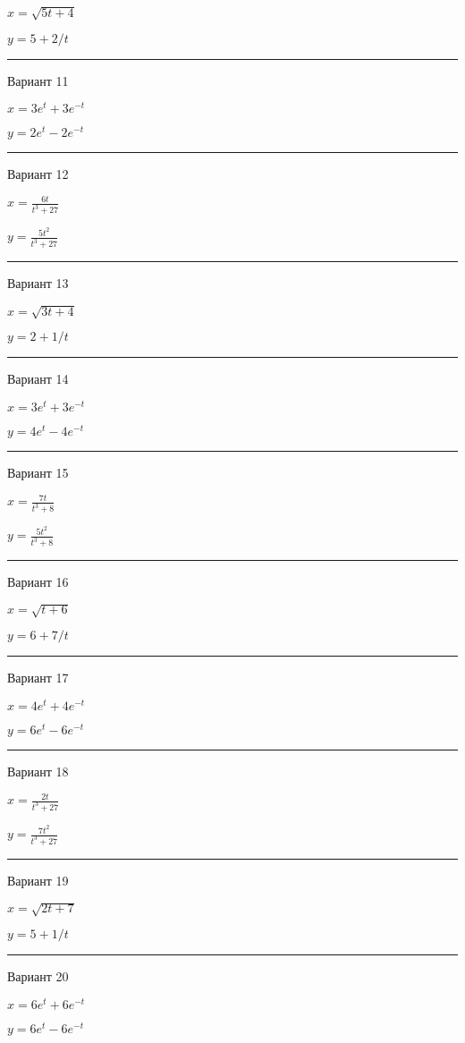 \documentclass[11pt]{report}
\begin{document}
$x = \sqrt{5 t + 4}$

$y = 5 + 2 / t$

\rule{\textwidth}{.2mm}

 Вариант 11

$x = 3 e^{t} + 3 e^{- t}$

$y = 2 e^{t} - 2 e^{- t}$

\rule{\textwidth}{.2mm}

 Вариант 12

$x = \frac{6 t}{t^{3} + 27}$

$y = \frac{5 t^{2}}{t^{3} + 27}$

\rule{\textwidth}{.2mm}

 Вариант 13

$x = \sqrt{3 t + 4}$

$y = 2 + 1 / t$

\rule{\textwidth}{.2mm}

 Вариант 14

$x = 3 e^{t} + 3 e^{- t}$

$y = 4 e^{t} - 4 e^{- t}$

\rule{\textwidth}{.2mm}

 Вариант 15

$x = \frac{7 t}{t^{3} + 8}$

$y = \frac{5 t^{2}}{t^{3} + 8}$

\rule{\textwidth}{.2mm}

 Вариант 16

$x = \sqrt{t + 6}$

$y = 6 + 7 / t$

\rule{\textwidth}{.2mm}

 Вариант 17

$x = 4 e^{t} + 4 e^{- t}$

$y = 6 e^{t} - 6 e^{- t}$

\rule{\textwidth}{.2mm}

 Вариант 18

$x = \frac{2 t}{t^{3} + 27}$

$y = \frac{7 t^{2}}{t^{3} + 27}$

\rule{\textwidth}{.2mm}

 Вариант 19

$x = \sqrt{2 t + 7}$

$y = 5 + 1 / t$

\rule{\textwidth}{.2mm}

 Вариант 20

$x = 6 e^{t} + 6 e^{- t}$

$y = 6 e^{t} - 6 e^{- t}$
\end{document}
